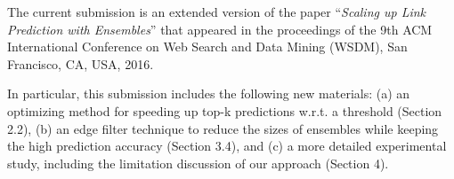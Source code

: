 The current submission is an extended version of the paper ``{\em Scaling up Link Prediction with Ensembles}''  that
appeared in the proceedings of the 9th ACM International Conference on Web Search and Data Mining (WSDM), San Francisco, CA, USA, 2016.

In particular, this submission includes the following new materials: (a) an optimizing method for speeding up top-k predictions w.r.t. a threshold (Section 2.2), (b) an edge filter technique to reduce the sizes of ensembles while keeping the high prediction accuracy (Section 3.4), and (c) a more detailed experimental study, including the limitation discussion of our approach (Section 4). 